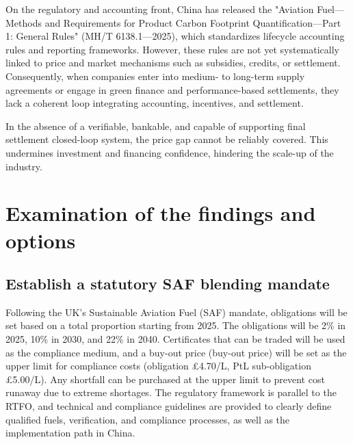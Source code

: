 \documentclass[a4paper,11pt]{article}
\begin{document}
On the regulatory and accounting front, China has released the "Aviation Fuel---Methods and Requirements for Product Carbon Footprint Quantification---Part 1: General Rules" (MH/T 6138.1---2025), which standardizes lifecycle accounting rules and reporting frameworks. However, these rules are not yet systematically linked to price and market mechanisms such as subsidies, credits, or settlement. Consequently, when companies enter into medium- to long-term supply agreements or engage in green finance and performance-based settlements, they lack a coherent loop integrating accounting, incentives, and settlement.

In the absence of a verifiable, bankable, and capable of supporting final settlement closed-loop system, the price gap cannot be reliably covered. This undermines investment and financing confidence, hindering the scale-up of the industry.




\section{Examination of the findings and options}

\subsection{Establish a statutory SAF blending mandate}
Following the UK's Sustainable Aviation Fuel (SAF) mandate, obligations will be set based on a total proportion starting from 2025. The obligations will be 2\% in 2025, 10\% in 2030, and 22\% in 2040. Certificates that can be traded will be used as the compliance medium, and a buy-out price (buy-out price) will be set as the upper limit for compliance costs (obligation £4.70/L, PtL sub-obligation £5.00/L). Any shortfall can be purchased at the upper limit to prevent cost runaway due to extreme shortages. The regulatory framework is parallel to the RTFO, and technical and compliance guidelines are provided to clearly define qualified fuels, verification, and compliance processes, as well as the implementation path in China.
\end{document}
